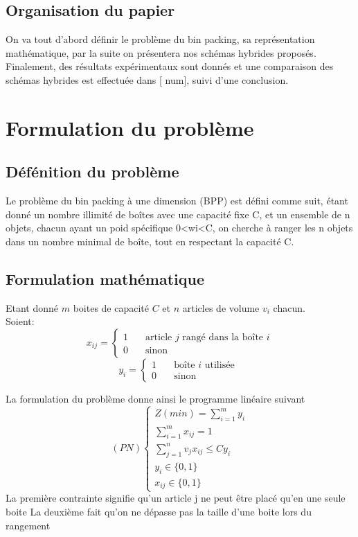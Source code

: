 \documentclass[preprint,12pt]{elsarticle}
\begin{document}
 
 \subsection{Organisation du papier}
 On va tout d’abord définir le problème du bin packing, sa représentation mathématique, par la suite on présentera nos schémas hybrides proposés. Finalement, des résultats expérimentaux sont donnés et une comparaison des schémas hybrides est effectuée  dans [ num], suivi d’une conclusion.

\section{Formulation du problème}
\subsection{Défénition du problème}
Le problème du bin packing à une dimension (BPP) est défini comme suit, étant donné un nombre illimité de boîtes avec une capacité fixe C, et un ensemble de n objets, chacun ayant un poid spécifique 0<wi<C, on cherche à ranger les n objets dans un nombre minimal de boîte, tout en respectant la capacité C. 

\subsection{Formulation mathématique}
Etant donné \(m\) boites de capacité \(C\) et \(n\) articles de volume \(v_i\) chacun. \\
    Soient: 
    \[ x_{ij} =
        \begin{cases}
            1  & \quad \text{article } j \text{ rangé dans la boîte } i \\
            0  & \quad \text{sinon } 
        \end{cases}
    \]
    \[ y_i =
    \begin{cases}
        1  & \quad \text{boîte } i \text{ utilisée } \\
        0  & \quad \text{sinon } 
    \end{cases}
    \]

La formulation du problème donne ainsi le programme linéaire suivant
\[(PN)
    \begin{cases}
        Z(min) = \displaystyle\sum_{i=1}^{m} y_i \\
        \displaystyle\sum_{i=1}^{m} x_{ij}  = 1 \\
        \displaystyle\sum_{j=1}^{n} v_j x_{ij} \le C y_i \\
        y_i \in \{0,1\} \\
        x_{ij} \in \{0,1\} 
    \end{cases}
\]  
La première contrainte signifie qu’un article j ne peut être placé qu’en une seule boite
La deuxième fait qu’on ne dépasse pas la taille d’une boite lors du rangement
\end{document}
